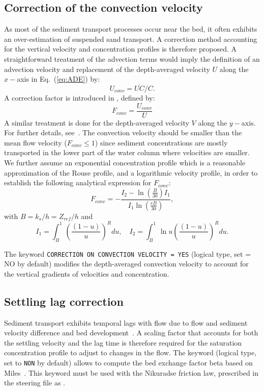 \subsection{Correction of the convection velocity}
As most of the sediment transport processes occur near the bed, it often exhibits an over-estimation of suspended sand transport.
A correction method accounting for the vertical velocity and concentration profiles is therefore proposed. A straightforward treatment of the advection terms would imply the
definition of an advection velocity and replacement of the depth-averaged
velocity $U$ along the $x-$axis in Eq.~(\ref{eq:ADE}) by:
\begin{equation*}
U_{conv} = \overline{UC}/C.
\end{equation*}
A correction factor is introduced in \sisyphe, defined by:
\begin{equation*}
F_{conv} =\frac{U_{conv}}{U} 
\end{equation*}
A similar treatment is done for the depth-averaged velocity $V$ along the $y-$axis. For further details, see~\cite{Huybrechts}.
The convection velocity should be smaller than the mean flow velocity ($F_{conv} \leq 1$) since sediment concentrations are mostly transported in the lower part of the water column where velocities are smaller. We further
assume an exponential concentration profile which is a reasonable
approximation of the Rouse profile, and a logarithmic velocity profile, in
order to establish the following analytical expression for $F_{conv}$:
\begin{equation*}
F_{conv} =-\frac{I_2 - \ln\left(\frac{B}{30}\right) I_1}{I_1 \ln\left( 
\frac{eB}{30}\right)}, 
\end{equation*}
with $B=k_s/h = Z_{ref}/h$ and 
\begin{equation*}
I_1 =\int_B^1\left(\frac{(1-u)}{u}\right)^R du,\quad I_2 = \int_B^1 \ln u \left(\frac{(1-u)}{u} \right)^R du.  
\end{equation*}

The keyword \texttt{CORRECTION ON CONVECTION VELOCITY = YES} (logical type, set {\ttfamily = NO} by default) modifies the depth-averaged convection velocity to account for the vertical gradients of velocities and concentration.

\subsection{Settling lag correction}
Sediment transport exhibits temporal lags with flow due to flow and sediment velocity difference and bed development~\cite{wu2007computational, Miles96}. A scaling factor that accounts for both the settling velocity and the lag time is therefore required for the saturation concentration profile to adjust to changes in the flow.
The keyword  (logical type, set to \texttt{NON} by default) allows to compute the bed exchange factor beta based on Miles~\cite{Miles96}. This keyword must be used with the Nikuradse friction law, prescribed in the  steering file as .

